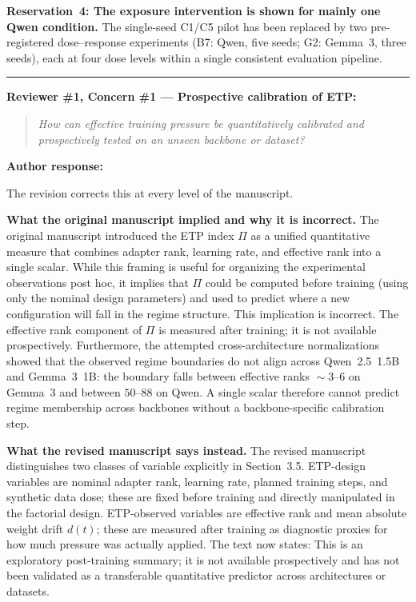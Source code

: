 \documentclass[11pt,a4paper]{article}
\newcommand{\newtext}[1]{#1}
\newcommand{\rconcern}[3]{%
  \bigskip\noindent\rule{\linewidth}{0.4pt}\par\medskip
  \noindent\textbf{\textcolor{rccolor}{#1 --- #2:}}\par
  \smallskip
  \begin{quote}\itshape\textcolor{rccolor}{#3}\end{quote}%
}
\newcommand{\arhead}[1]{\medskip\noindent\textbf{#1}\par\smallskip}
\newcommand{\newtext}[1]{\textcolor{chgcolor}{``#1''}}
\begin{document}
\textbf{Reservation~4: The exposure intervention is shown for mainly one Qwen condition.}
The single-seed C1/C5 pilot has been replaced by two pre-registered
dose--response experiments (B7: Qwen, five seeds; G2: Gemma~3, three seeds),
each at four dose levels within a single consistent evaluation pipeline.

\rconcern{Reviewer \#1, Concern \#1}{Prospective calibration of ETP}{How can effective training pressure be quantitatively calibrated and prospectively tested on an unseen backbone or dataset?}

\arhead{Author response:}
The revision corrects this at every level of the manuscript.

\textbf{What the original manuscript implied and why it is incorrect.}
The original manuscript introduced the ETP index $\Pi$ as a unified
quantitative measure that combines adapter rank, learning rate, and
effective rank into a single scalar. While this framing is useful for
organizing the experimental observations post hoc, it implies that $\Pi$
could be computed before training (using only the nominal design parameters)
and used to predict where a new configuration will fall in the regime
structure. This implication is incorrect. The effective rank component of
$\Pi$ is measured after training; it is not available prospectively.
Furthermore, the attempted cross-architecture normalizations showed that
the observed regime boundaries do not align across Qwen~2.5~1.5B and
Gemma~3~1B: the boundary falls between effective ranks ${}\sim3$--$6$
on Gemma~3 and between $50$--$88$ on Qwen. A single scalar therefore
cannot predict regime membership across backbones without a backbone-specific
calibration step.

\textbf{What the revised manuscript says instead.}
The revised manuscript distinguishes two classes of variable explicitly in
Section~3.5. ETP-design variables are nominal adapter rank, learning rate,
planned training steps, and synthetic data dose; these are fixed before
training and directly manipulated in the factorial design.
ETP-observed variables are effective rank and mean absolute weight drift
$d(t)$; these are measured after training as diagnostic proxies for how
much pressure was actually applied. The text now states:
\newtext{This is an exploratory post-training summary; it is not available
prospectively and has not been validated as a transferable quantitative
predictor across architectures or datasets.}
\end{document}
